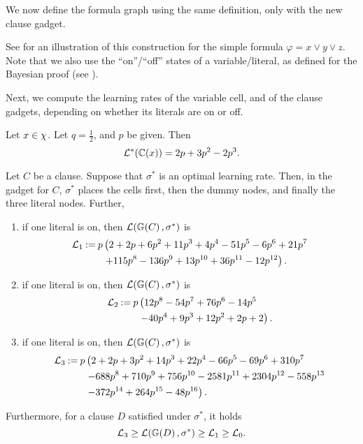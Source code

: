 We now define the formula graph using the same definition, only with the new clause gadget.

\bayesianGraph*

See  for an illustration of this construction for the simple formula $ \varphi = x \lor y \lor z $.
Note that we also use the ``on''/``off'' states of a variable/literal, as defined for the Bayesian proof (see ).



Next, we compute the learning rates of the variable cell, and of the clause gadgets, depending on whether its literals are on or off.

\begin{lemma} \label{lemma:maj_MD_cellLearningRate}
    Let $x \in \chi$.
    Let $ q = \frac 12 $, and $ p $ be given.
    Then \[
	\mathcal{L}^* (\mathbb{C}\!\left(x\right)) = 2p + 3p^2 -2p^3.
    \]
\end{lemma}

\begin{lemma}\label{lemma:maj_100CLR} 
    Let $C$ be a clause.
    Suppose that $\sigma^*$ is an optimal learning rate.
    Then, in the gadget for $C$, $\sigma^*$ places the cells first, then the dummy nodes, and finally the three literal nodes.
    Further, \begin{enumerate}
        \item if one literal is on, then $\mathcal{L}(\mathbb{G}\!\left(C\right), \sigma^*) $ is
        \begin{align*}
                \mathcal{L}_1 \mathbin{:=} p &\left(2 + 2 p + 6 p^2 + 11 p^3 + 4 p^4 - 51 p^5 - 6 p^6  + 21 p^7 \right. \\
                               & \left. + 115 p^8 - 136 p^9 + 13 p^{10} + 36 p^{11} - 12 p^{12} \right).
            \end{align*}
        \item if one literal is on, then $\mathcal{L}(\mathbb{G}\!\left(C\right), \sigma^*)$ is \begin{align*}
                \mathcal{L}_2 \mathbin{:=} p & \left(12 p^8-54 p^7+76 p^6-14 p^5 \right. \\
                               & \left. -40 p^4+9 p^3+12 p^2+2 p+2\right).
            \end{align*}
        \item if one literal is on, then $\mathcal{L}(\mathbb{G}\!\left(C\right), \sigma^*) $ is \begin{align*}
                \mathcal{L}_3 \mathbin{:=} p & \left(2 + 2 p + 3 p^2 + 14 p^3 + 22 p^4 - 66 p^5 - 69 p^6 + 310 p^7 \right.\\
                            & \left.- 688 p^8 + 710 p^9 + 756 p^{10} - 2581 p^{11} + 2304 p^{12} - 558 p^{13}\right.\\ 
                            & \left.- 372 p^{14} + 264 p^{15} - 48 p^{16} \right).
            \end{align*}
    \end{enumerate}
    Furthermore, for a clause $ D $ satisfied under $ \sigma^* $, it holds \[
	    \mathcal{L}_3 \geq \mathcal{L}(\mathbb{G}\!\left(D\right), \sigma^*) \geq \mathcal{L}_1 \geq \mathcal{L}_0.
	\]
\end{lemma}

